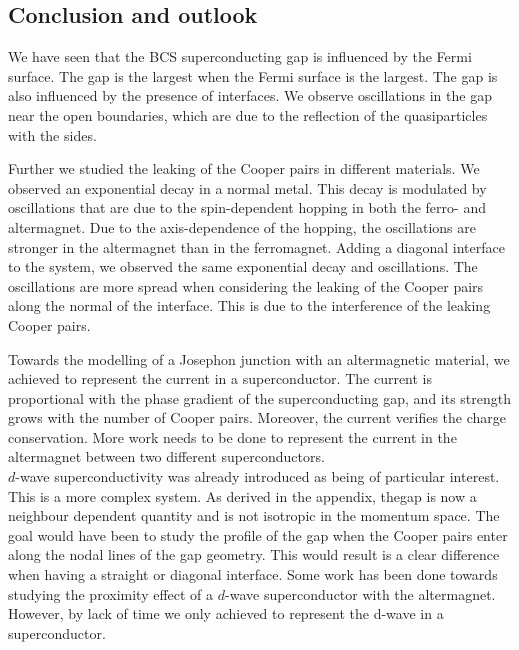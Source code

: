 \documentclass[..\main.tex]{subfile}
\begin{document}
\subsection{Conclusion and outlook}
We have seen that the BCS superconducting gap is influenced by the Fermi surface. The gap is the largest when the Fermi surface is the largest.
The gap is also influenced by the presence of interfaces. We observe oscillations in the gap near the open boundaries, which are due to the reflection
of the quasiparticles with the sides.

Further we studied the leaking of the Cooper pairs in different materials. We observed an exponential decay in a normal metal.
This decay is modulated by oscillations that are due to the spin-dependent hopping in both the ferro- and altermagnet.
Due to the axis-dependence of the hopping, the oscillations are stronger in the altermagnet than in the ferromagnet.
Adding a diagonal interface to the system, we observed the same exponential decay and oscillations. The oscillations are more spread when considering
the leaking of the Cooper pairs along the normal of the interface. This is due to the interference of the leaking Cooper pairs.

Towards the modelling of a Josephon junction with an altermagnetic material, we achieved to represent the current in a superconductor.
The current is proportional with the phase gradient of the superconducting gap, and its strength grows with the number of Cooper pairs.
Moreover, the current verifies the charge conservation.
More work needs to be done to represent the current in the altermagnet between two different superconductors.\\

$d$-wave superconductivity was already introduced as being of particular interest. This is a more complex system.
As derived in the appendix, thegap is now a neighbour dependent quantity and is not isotropic in the momentum space. The goal would have been 
to study the profile of the gap when the Cooper pairs enter along the nodal lines of the gap geometry. This
would result is a clear difference when having a straight or diagonal interface. 
 Some work has been done towards studying the
proximity effect of a $d$-wave superconductor with the altermagnet. However, by lack of time we only achieved to represent the d-wave in a superconductor.
\end{document}
